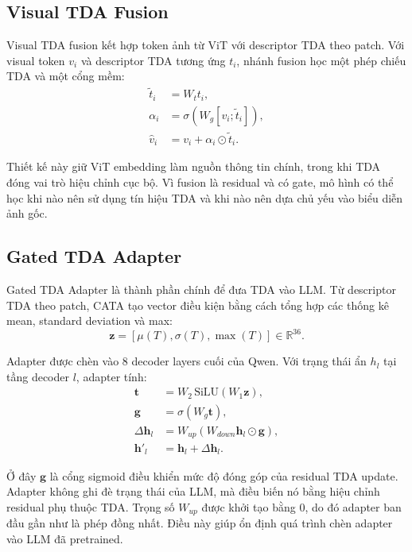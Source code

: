 \documentclass[11pt,a4paper]{article}
\begin{document}
\subsection{Visual TDA Fusion}

Visual TDA fusion kết hợp token ảnh từ ViT với descriptor TDA theo patch. Với visual token $v_i$ và descriptor TDA tương ứng $t_i$, nhánh fusion học một phép chiếu TDA và một cổng mềm:
\begin{align}
\tilde{t}_i &= W_t t_i, \\
\alpha_i &= \sigma(W_g [v_i; \tilde{t}_i]), \\
\hat{v}_i &= v_i + \alpha_i \odot \tilde{t}_i.
\end{align}

Thiết kế này giữ ViT embedding làm nguồn thông tin chính, trong khi TDA đóng vai trò hiệu chỉnh cục bộ. Vì fusion là residual và có gate, mô hình có thể học khi nào nên sử dụng tín hiệu TDA và khi nào nên dựa chủ yếu vào biểu diễn ảnh gốc.

\subsection{Gated TDA Adapter}

Gated TDA Adapter là thành phần chính để đưa TDA vào LLM. Từ descriptor TDA theo patch, CATA tạo vector điều kiện bằng cách tổng hợp các thống kê mean, standard deviation và max:
\begin{equation}
\mathbf{z} = [\mu(T), \sigma(T), \max(T)] \in \mathbb{R}^{36}.
\end{equation}

Adapter được chèn vào 8 decoder layers cuối của Qwen. Với trạng thái ẩn $h_l$ tại tầng decoder $l$, adapter tính:
\begin{align}
\mathbf{t} &= W_2\,\mathrm{SiLU}(W_1\mathbf{z}), \\
\mathbf{g} &= \sigma(W_g\mathbf{t}), \\
\Delta \mathbf{h}_l &= W_{up}\left(W_{down}\mathbf{h}_l \odot \mathbf{g}\right), \\
\mathbf{h}'_l &= \mathbf{h}_l + \Delta \mathbf{h}_l.
\end{align}

Ở đây $\mathbf{g}$ là cổng sigmoid điều khiển mức độ đóng góp của residual TDA update. Adapter không ghi đè trạng thái của LLM, mà điều biến nó bằng hiệu chỉnh residual phụ thuộc TDA. Trọng số $W_{up}$ được khởi tạo bằng 0, do đó adapter ban đầu gần như là phép đồng nhất. Điều này giúp ổn định quá trình chèn adapter vào LLM đã pretrained.
\end{document}
